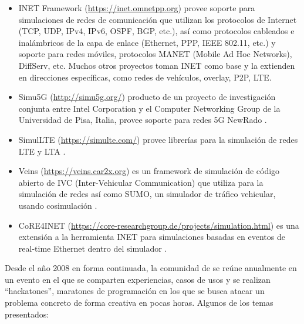 \begin{itemize}
    \item INET Framework (\url{https://inet.omnetpp.org}) provee soporte para
    simulaciones de redes de comunicación que utilizan los protocolos de
    Internet (TCP, UDP, IPv4, IPv6, OSPF, BGP, etc.), así como protocolos
    cableados e inalámbricos de la capa de enlace (Ethernet, PPP, IEEE 802.11,
    etc.) y soporte para redes móviles, protocolos MANET (Mobile Ad Hoc
    Networks), DiffServ, etc. Muchos otros proyectos toman INET como base y la
    extienden en direcciones específicas, como redes de vehículos, overlay,
    P2P, LTE.

    \item Simu5G (\url{http://simu5g.org/}) producto de un proyecto de
    investigación conjunta entre Intel Corporation y el Computer Networking
    Group de la Universidad de Pisa, Italia, provee soporte para redes 5G
    NewRado \cite{Simu5G}.

    \item SimulLTE (\url{https://simulte.com/}) provee librerías para la
    simulación de redes LTE y LTA \cite{SimuLTE}.

    \item Veins (\url{https://veins.car2x.org}) es un framework de simulación
    de código abierto de IVC (Inter-Vehicular Communication) que utiliza
    \omnetpp{} para la simulación de redes así como SUMO, un simulador de
    tráfico vehicular, usando cosimulación \cite{Veins}.

    \item CoRE4INET
    (\url{https://core-researchgroup.de/projects/simulation.html}) es una
    extensión a la herramienta INET para simulaciones basadas en eventos de
    real-time Ethernet dentro del simulador \omnetpp{}.
\end{itemize}

Desde el año 2008 en forma continuada, la comunidad de \omnetpp{} se reúne
anualmente en un evento en el que se comparten experiencias, casos de usos y se
realizan ``hackatones'', maratones de programación en los que se busca atacar
un problema concreto de forma creativa en pocas horas. Algunos de los temas
presentados:

